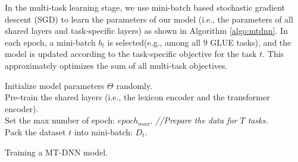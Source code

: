 In the multi-task learning stage, we use mini-batch based stochastic gradient descent (SGD) to learn the parameters of our model (i.e., the parameters of all shared layers and task-specific layers) as shown in Algorithm \ref{algo:mtdnn}.  In each epoch, a mini-batch $b_t$ is selected(e.g., among all 9 GLUE tasks), and the model is updated according to the task-specific objective for the task $t$. This approximately optimizes the sum of all multi-task objectives. 
\begin{algorithm}[ht!]
 \SetAlgoLined
Initialize model parameters $\Theta$ randomly.  \\
Pre-train the shared layers (i.e., the lexicon encoder and the transformer encoder). \\
Set the max number of epoch: $epoch_{max}$.
\textit{//Prepare the data for $T$ tasks.}\\
{
    Pack the dataset $t$ into mini-batch: $D_t$.
}

 \For{$epoch$ in $1,2,...,epoch_{max}$}{
     1. Merge all the datasets: $D =D_1 \cup D_2 ... \cup D_T$ \\
     2. Shuffle $D$ \\
     \For{$b_t$ in D}{
        \textit{//$b_t$ is a mini-batch of task $t$.} \\
     3. Compute loss : $L(\Theta)$ \\
        \hspace{0.3cm} $L(\Theta)=$ Eq.~\ref{eqn:cross-entropy-loss} for classification \\
        \hspace{0.3cm} $L(\Theta)=$ Eq.~\ref{eqn:msq-loss} for regression \\
        \hspace{0.3cm} $L(\Theta)=$ Eq.~\ref{eqn:ranking-loss} for ranking \\
     4. Compute gradient: $\nabla(\Theta)$ \\
     5. Update model: $\Theta = \Theta - \epsilon \nabla(\Theta)$ \\
     }
 }
 \caption{\label{algo:mtdnn} Training a MT-DNN model.}
\end{algorithm} %

